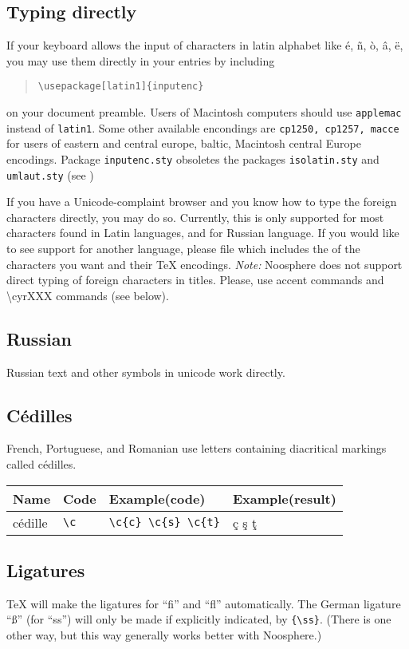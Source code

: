 \subsection*{Typing directly}
If your keyboard allows the input of characters in latin alphabet like \'e, \~n, \`o, \^a, \"e, you may use them directly in your entries by including
\begin{quote}
\begin{verbatim}
\usepackage[latin1]{inputenc}
\end{verbatim}
\end{quote}
on your document preamble. Users of Macintosh computers should use \texttt{applemac} instead of \texttt{latin1}. Some other available encondings are \texttt{cp1250, cp1257, macce} for users of eastern and central europe, baltic, Macintosh central Europe encodings.
Package \texttt{inputenc.sty} obsoletes the packages \texttt{isolatin.sty} and \texttt{umlaut.sty} (see  )

If you have a Unicode-complaint browser and you know how to type the foreign characters directly, you may do so. Currently, this is only supported for most characters found in Latin languages, and for Russian language. If you would like to see support for another language, please file  which includes the  of the characters you want and their TeX encodings. \emph{Note:} Noosphere does not support direct typing of foreign characters in titles. Please, use accent commands and \textbackslash{}cyrXXX commands (see below).

\subsection*{Russian}
Russian text and other symbols in unicode work directly.

\subsection*{C\'edilles}
French, Portuguese, and Romanian use letters containing diacritical markings called c\'edilles.
\begin{center}
\begin{tabular*}{.8\textwidth}{llll}
\textbf{Name}&\textbf{Code}&\textbf{Example(code)}&\textbf{Example(result)}\\\hline
c\'edille & \verb+\c+ & \verb+\c{c} \c{s} \c{t}+ & \c{c} \c{s} \c{t} \\
\end{tabular*}
\end{center}

\subsection*{Ligatures}
\TeX{} will make the ligatures for ``fi'' and ``fl'' automatically. The German ligature ``{\ss}'' (for ``ss'') will only be made if explicitly indicated, by \verb+{\ss}+. (There is one other way, but this way generally works better with Noosphere.)
